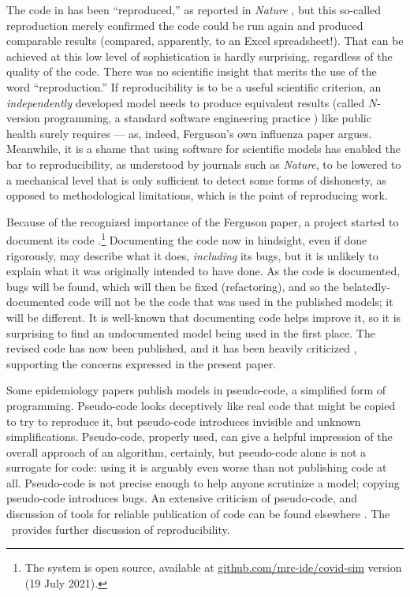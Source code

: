 \documentclass{comjnl}
\begin{document}
The code in \cite{nature-summary,ICmodel} has been ``reproduced,'' as reported in \emph{Nature\/} \cite{codecheck,thumbs-up}, but this so-called reproduction merely confirmed the code could be run again and produced comparable results (compared, apparently, to an Excel spreadsheet!). That can be achieved at this low level of sophistication is hardly surprising, regardless of the quality of the code. There was no scientific insight that merits the use of the word ``reproduction.'' If reproducibility is to be a useful scientific criterion, an \emph{independently\/} developed model needs to produce equivalent results (called $N$-version programming, a standard software engineering practice \cite{NVP}) like public health surely requires --- as, indeed, Ferguson's own influenza paper \cite{nvp-ferguson} argues. Meanwhile, it is a shame that using software for scientific models has enabled the bar to reproducibility, as understood by journals such as \emph{Nature}, to be lowered to a mechanical level that is only sufficient to detect some forms of dishonesty, as opposed to methodological limitations, which is the point of reproducing work.

Because of the recognized importance of the Ferguson paper, a project started to document its code  \cite{refactoring}.\footnote{The system is open source, available at \url{github.com/mrc-ide/covid-sim} version (19 July 2021).} Documenting the code now in hindsight, even if done rigorously, may describe what it does, \emph{including\/} its bugs, but it is unlikely to explain what it was originally intended to have done. As the code is documented, bugs will be found, which will then be fixed (refactoring), and so the belatedly-documented code will not be the code that was used in the published models; it will be different. It is well-known that documenting code helps improve it, so it is surprising to find an undocumented model being used in the first place. The revised code has now been published, and it has been heavily criticized , supporting the concerns expressed in the present paper.

Some epidemiology papers  publish models in pseudo-code, a simplified form of programming. Pseudo-code looks deceptively like real code that might be copied to try to reproduce it, but pseudo-code introduces invisible and unknown simplifications. Pseudo-code, properly used, can give a helpful impression of the overall approach of an algorithm, certainly, but pseudo-code alone is not a surrogate for code: using it is arguably even worse than not publishing code at all. Pseudo-code is not precise enough to help anyone scrutinize a model; copying pseudo-code introduces bugs. An extensive criticism of pseudo-code, and discussion of tools for reliable publication of code can be found elsewhere \cite{relit}. {The \supplement\ provides further discussion of reproducibility.}
\end{document}

